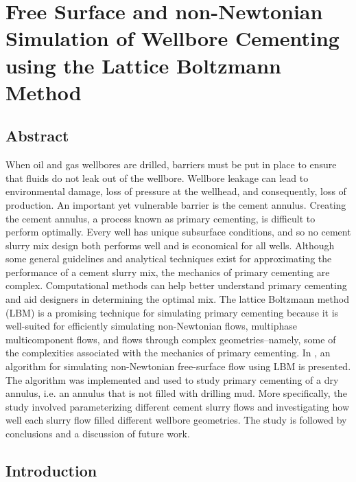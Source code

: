\documentclass[pdftex,ms]{pittetd}
\begin{document}

\chapter{Free Surface and non-Newtonian Simulation of Wellbore Cementing using the Lattice Boltzmann Method} \label{cha:lbm-cement}

\section*{Abstract}

When oil and gas wellbores are drilled, barriers must be put in place to ensure that fluids do not leak out of the wellbore.
Wellbore leakage can lead to environmental damage, loss of pressure at the wellhead, and consequently, loss of production.
An important yet vulnerable barrier is the cement annulus.
Creating the cement annulus, a process known as primary cementing, is difficult to perform optimally.
Every well has unique subsurface conditions, and so no cement slurry mix design both performs well and is economical for all wells.
Although some general guidelines and analytical techniques exist for approximating the performance of a cement slurry mix, the mechanics of primary cementing are complex.
Computational methods can help better understand primary cementing and aid designers in determining the optimal mix.
The lattice Boltzmann method (LBM) is a promising technique for simulating primary cementing because it is well-suited for efficiently simulating non-Newtonian flows, multiphase multicomponent flows, and flows through complex geometries--namely, some of the complexities associated with the mechanics of primary cementing.
In , an algorithm for simulating non-Newtonian free-surface flow using LBM is presented.
The algorithm was implemented and used to study primary cementing of a dry annulus, i.e. an annulus that is not filled with drilling mud.
More specifically, the study involved parameterizing different cement slurry flows and investigating how well each slurry flow filled different wellbore geometries.
The study is followed by conclusions and a discussion of future work.

\section{Introduction}
\end{document}
